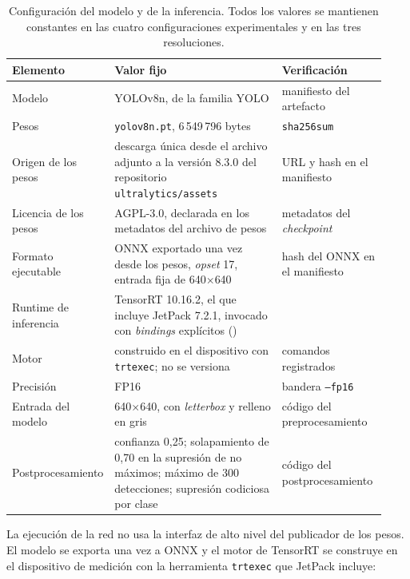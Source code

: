 \begin{table}[H]
  \centering
  \caption[Configuración del modelo y de la inferencia]{Configuración del
  modelo y de la inferencia. Todos los valores se mantienen constantes en las
  cuatro configuraciones experimentales y en las tres resoluciones.}
  \label{tab:model-configuration}
  \begin{tabular}{@{}L{0.18\linewidth}L{0.46\linewidth}L{0.29\linewidth}@{}}
    \toprule
    \textbf{Elemento} & \textbf{Valor fijo} & \textbf{Verificación} \\
    \midrule
    Modelo & YOLOv8n, de la familia YOLO & manifiesto del artefacto \\
    Pesos & \texttt{yolov8n.pt}, 6\,549\,796 bytes & \texttt{sha256sum} \\
    Origen de los pesos & descarga única desde el archivo adjunto a la
      versión 8.3.0 del repositorio \texttt{ultralytics/assets} & URL y hash
      en el manifiesto \\
    Licencia de los pesos & AGPL-3.0, declarada en los metadatos del archivo
      de pesos & metadatos del \emph{checkpoint} \\
    Formato ejecutable & ONNX exportado una vez desde los pesos,
      \emph{opset} 17, entrada fija de 640$\times$640 & hash del ONNX en el
      manifiesto \\
    Runtime de inferencia & TensorRT 10.16.2, el que incluye JetPack 7.2.1,
      invocado con \emph{bindings} explícitos
      () &  \\
    Motor & construido en el dispositivo con \texttt{trtexec}; no se versiona
      & comandos registrados \\
    Precisión & FP16 & bandera \texttt{--fp16} \\
    Entrada del modelo & 640$\times$640, con \emph{letterbox} y relleno en
      gris & código del preprocesamiento \\
    Postprocesamiento & confianza 0,25; solapamiento de 0,70 en la
      supresión de no máximos; máximo de 300 detecciones; supresión
      codiciosa por clase & código del postprocesamiento \\
    \bottomrule
  \end{tabular}
\end{table}

La ejecución de la red no usa la interfaz de alto nivel del publicador de los
pesos. El modelo se exporta una vez a ONNX y el motor de TensorRT se
construye en el dispositivo de medición con la herramienta \texttt{trtexec}
que JetPack incluye:

